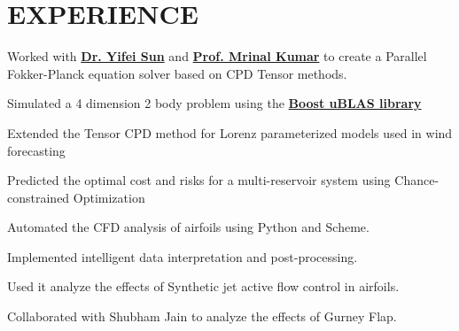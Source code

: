 \documentclass[]{resume}
\begin{document}
\hfill
\begin{minipage}[t]{0.66\textwidth}


\section{EXPERIENCE}
\vspace{\topsep} %
\begin{tightemize}
\item Worked with \textbf{\href{http://plaza.ufl.edu/yfsun/index.html}{Dr. Yifei Sun}} and
	\textbf{\href{http://web.mae.ufl.edu/~mrinalkumar/index.html}{Prof. Mrinal Kumar}} to create a Parallel
	Fokker-Planck equation solver based on CPD Tensor methods.
\item Simulated a 4 dimension 2 body problem using the
	\textbf{\href{http://www.boost.org/doc/libs/1_58_0/libs/numeric/ublas/doc}{Boost uBLAS library}}
\item Extended the Tensor CPD method for Lorenz parameterized models used in wind forecasting
\end{tightemize}
\begin{tightemize}
\item Predicted the optimal cost and risks for a multi-reservoir system using Chance-constrained Optimization
\end{tightemize}
\sectionsep

\begin{tightemize}
\item Automated the CFD analysis of airfoils using Python and Scheme.
\item Implemented intelligent data interpretation and post-processing.
\item Used it analyze the effects of Synthetic jet active flow control in airfoils.
\item Collaborated with Shubham Jain to analyze the effects of Gurney Flap.
\end{tightemize}
\sectionsep



\end{minipage}
\end{document}
